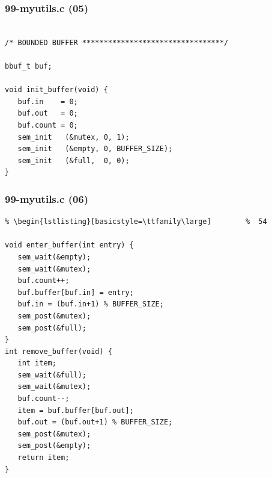 \documentclass[xcolor=table, notheorems, hyperref={pdfpagelabels=false}]{beamer}
\begin{document}
\begin{frame}[fragile]
\frametitle{99-myutils.c (05)}
\begin{lstlisting}[basicstyle=\ttfamily\large]        %  54

/* BOUNDED BUFFER *********************************/

bbuf_t buf;

void init_buffer(void) {
   buf.in    = 0;
   buf.out   = 0;
   buf.count = 0;
   sem_init   (&mutex, 0, 1);
   sem_init   (&empty, 0, BUFFER_SIZE);
   sem_init   (&full,  0, 0);
}

\end{lstlisting}
\end{frame}

\begin{frame}[fragile]
\frametitle{99-myutils.c (06)}
\begin{lstlisting}[basicstyle=\ttfamily\footnotesize] %  72
% \begin{lstlisting}[basicstyle=\ttfamily\small]        %  65
% \begin{lstlisting}[basicstyle=\ttfamily\large]        %  54

void enter_buffer(int entry) {
   sem_wait(&empty);
   sem_wait(&mutex);
   buf.count++;
   buf.buffer[buf.in] = entry;
   buf.in = (buf.in+1) % BUFFER_SIZE;
   sem_post(&mutex);
   sem_post(&full);
}
int remove_buffer(void) {
   int item;
   sem_wait(&full);
   sem_wait(&mutex);
   buf.count--;
   item = buf.buffer[buf.out];
   buf.out = (buf.out+1) % BUFFER_SIZE;
   sem_post(&mutex);
   sem_post(&empty);
   return item;
}

\end{lstlisting}
\end{frame}
\end{document}
